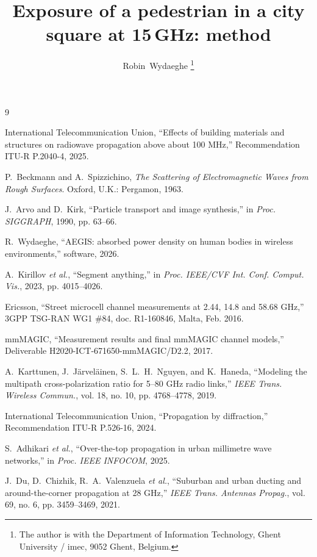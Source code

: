 \documentclass[journal]{IEEEtran}
\begin{document}
\title{Exposure of a pedestrian in a city square at 15\,GHz: method}
\author{Robin~Wydaeghe%
\thanks{The author is with the Department of Information Technology, Ghent
University / imec, 9052 Ghent, Belgium.}}

\maketitle



\begin{thebibliography}{9}

International Telecommunication Union, ``Effects of building materials and
structures on radiowave propagation above about 100 MHz,'' Recommendation
ITU-R P.2040-4, 2025.

P.~Beckmann and A.~Spizzichino, \emph{The Scattering of Electromagnetic Waves
from Rough Surfaces}. Oxford, U.K.: Pergamon, 1963.

J.~Arvo and D.~Kirk, ``Particle transport and image synthesis,'' in
\emph{Proc. SIGGRAPH}, 1990, pp. 63--66.

R.~Wydaeghe, ``AEGIS: absorbed power density on human bodies in wireless
environments,'' software, 2026.

A.~Kirillov \emph{et al.}, ``Segment anything,'' in \emph{Proc. IEEE/CVF Int.
Conf. Comput. Vis.}, 2023, pp. 4015--4026.

Ericsson, ``Street microcell channel measurements at 2.44, 14.8 and 58.68 GHz,''
3GPP TSG-RAN WG1 \#84, doc. R1-160846, Malta, Feb. 2016.

mmMAGIC, ``Measurement results and final mmMAGIC channel models,'' Deliverable
H2020-ICT-671650-mmMAGIC/D2.2, 2017.

A.~Karttunen, J.~J\"arvel\"ainen, S.~L.~H.~Nguyen, and K.~Haneda, ``Modeling the
multipath cross-polarization ratio for 5--80 GHz radio links,'' \emph{IEEE Trans.
Wireless Commun.}, vol. 18, no. 10, pp. 4768--4778, 2019.

International Telecommunication Union, ``Propagation by diffraction,''
Recommendation ITU-R P.526-16, 2024.

S.~Adhikari \emph{et al.}, ``Over-the-top propagation in urban millimetre wave
networks,'' in \emph{Proc. IEEE INFOCOM}, 2025.

J.~Du, D.~Chizhik, R.~A.~Valenzuela \emph{et al.}, ``Suburban and urban ducting
and around-the-corner propagation at 28 GHz,'' \emph{IEEE Trans. Antennas
Propag.}, vol. 69, no. 6, pp. 3459--3469, 2021.


\end{thebibliography}
\end{document}
